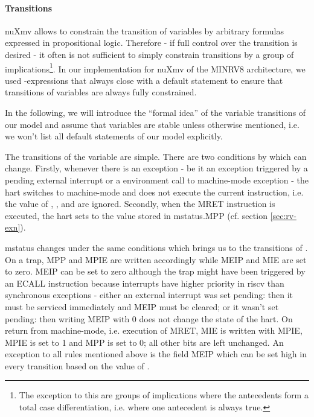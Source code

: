 \paragraph{Transitions}
nuXmv allows to constrain the transition of variables by arbitrary formulas expressed in propositional logic.
Therefore - if full control over the transition is desired - it often is not sufficient to simply constrain transitions by a group of implications\footnote{%
    The exception to this are groups of implications where the antecedents form a total case differentiation, i.e. where one antecedent is always true.
}.
In our implementation for nuXmv of the MINRV8 architecture, we used -expressions that always close with a default statement to ensure that transitions of variables are always fully constrained.

In the following, we will introduce the \enquote{formal idea} of the variable transitions of our model and assume that variables are stable unless otherwise mentioned, i.e. we won't list all default statements of our model explicitly.

The transitions of the  variable are simple.
There are two conditions by which  can change.
Firstly, whenever there is an exception - be it an exception triggered by a pending external interrupt or a environment call to machine-mode exception - the \gls{hart} switches to machine-mode and does not execute the current instruction, i.e. the value of , ,  and  are ignored.
Secondly, when the MRET instruction is executed, the \gls{hart} sets  to the value stored in \gls{mstatus}.MPP (cf. section \ref{sec:rv-exn}).

\gls{mstatus} changes under the same conditions which brings us to the transitions of .
On a trap, MPP and MPIE are written accordingly while MEIP and MIE are set to zero.
MEIP can be set to zero although the trap might have been triggered by an ECALL instruction because interrupts have higher priority in \gls{riscv} than synchronous exceptions - either an external interrupt was set pending: then it must be serviced immediately and MEIP must be cleared; or it wasn't set pending: then writing MEIP with 0 does not change the state of the \gls{hart}.
On return from machine-mode, i.e. execution of MRET, MIE is written with MPIE, MPIE is set to 1 and MPP is set to 0; all other bits are left unchanged.
An exception to all rules mentioned above is the field MEIP which can be set high in every transition based on the value of .

